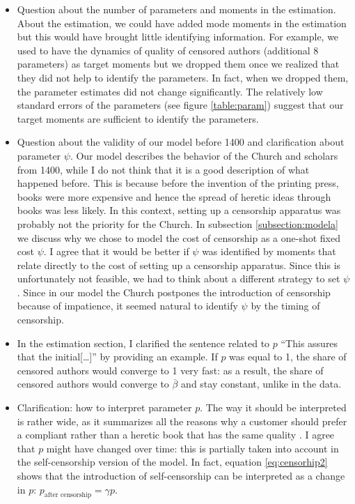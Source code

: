 \begin{itemize}
\item Question about the number of parameters and moments in the estimation. About the estimation, we could have added mode moments in the estimation but this would have brought little identifying information. For example, we used to have the dynamics of quality of censored authors (additional 8 parameters) as target moments but we dropped them once we realized that they did not help to identify the parameters. In fact, when we dropped them, the parameter estimates did not change significantly. The relatively low standard errors of the parameters (see figure \ref{table:param}) suggest that our target moments are sufficient to identify the parameters.

\item Question about the validity of our model before 1400 and clarification about parameter $\psi$. Our model describes the behavior of the Church and scholars from 1400, while I do not think that it is a good description of what happened before. This is because before the invention of the printing press, books were more expensive and hence the spread of heretic ideas through books was less likely. In this context, setting up a censorship apparatus was probably not the priority for the Church. In subsection \ref{subsection:modela} we discuss why we chose to model the cost of censorship as a one-shot fixed cost  $\psi$.
I agree that it would be better if $\psi$ was identified by moments that relate directly to the cost of setting up a censorship apparatus. Since this is unfortunately not feasible, we had to think about a different strategy to set $\psi$. Since in our model the Church postpones the introduction of censorship because of impatience, it seemed natural to identify $\psi$ by the timing of censorship. 
\item In the estimation section, I clarified the sentence related to $p$ ``This assures that the initial[…]'' by providing an example. If $p$ was equal to 1, the share of censored authors would converge to 1 very fast: as a result, the share of censored authors would converge to $\overline{\beta}$ and stay constant, unlike in the data.
\item Clarification: how to interpret parameter $p$. The way it should be interpreted is rather wide, as it summarizes all the reasons why a customer should prefer a compliant rather than a heretic book that has the same quality . I agree that $p$ might have changed over time: this is partially taken into account in the self-censorship version of the model. In fact, equation \ref{eq:censorhip2} shows that the introduction of self-censorship can be interpreted as a change in $p$: $p_{\text{after censorship}}=\gamma p$.




\end{itemize}
